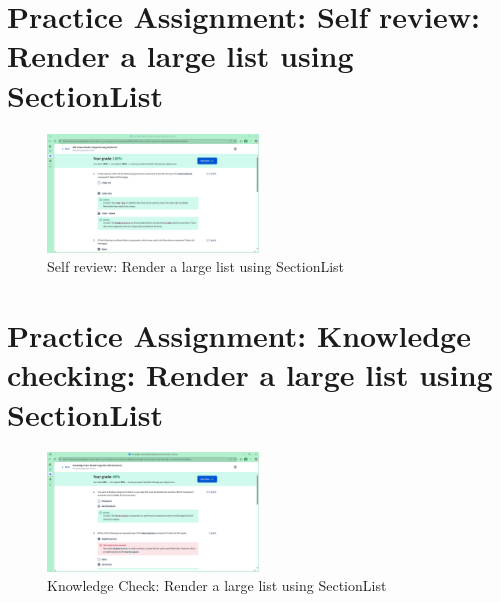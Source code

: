 \section{Practice Assignment: Self review: Render a large list using SectionList}
\begin{figure}[H]
    \centering
    \includegraphics[width=0.5\textwidth]{images/sr-2.png}
    \caption{Self review: Render a large list using SectionList}
\end{figure}

\section{Practice Assignment: Knowledge checking: Render a large list using SectionList}
\begin{figure}[H]
    \centering
    \includegraphics[width=0.5\textwidth]{images/kc-2.png}
    \caption{Knowledge Check: Render a large list using SectionList}
\end{figure}